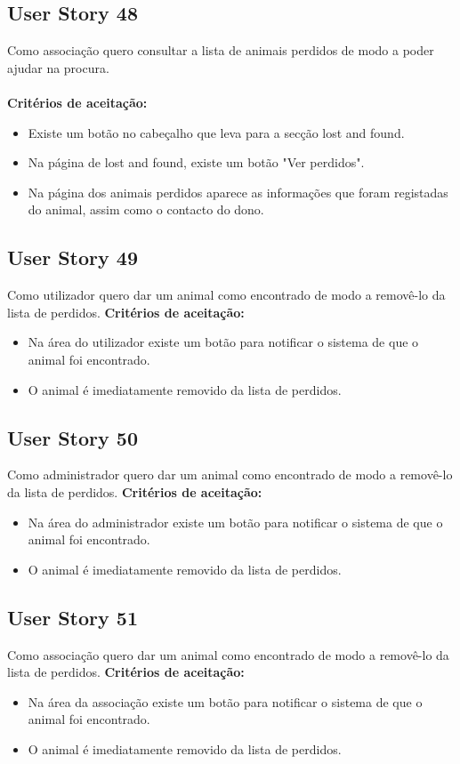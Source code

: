 \documentclass[a4paper,11pt]{article}
\begin{document}
\subsection*{User Story 48}
Como associação quero consultar a lista de animais perdidos de modo a poder ajudar na procura.\\\\
\textbf{Critérios de aceitação:}
\begin{itemize}
  \item Existe um botão no cabeçalho que leva para a secção lost and found.
  \item Na página de lost and found, existe um botão "Ver perdidos".
  \item Na página dos animais perdidos aparece as informações que foram registadas do animal, assim como o contacto do dono.
\end{itemize}

\subsection*{User Story 49}
Como utilizador quero dar um animal como encontrado de modo a removê-lo da lista de perdidos.
\textbf{Critérios de aceitação:}
\begin{itemize}
  \item Na área do utilizador existe um botão para notificar o sistema de que o animal foi encontrado.
  \item O animal é imediatamente removido da lista de perdidos.
\end{itemize}

\subsection*{User Story 50}
Como administrador quero dar um animal como encontrado de modo a removê-lo da lista de perdidos.
\textbf{Critérios de aceitação:}
\begin{itemize}
  \item Na área do administrador existe um botão para notificar o sistema de que o animal foi encontrado.
  \item O animal é imediatamente removido da lista de perdidos.
\end{itemize}

\subsection*{User Story 51}
Como associação quero dar um animal como encontrado de modo a removê-lo da lista de perdidos.
\textbf{Critérios de aceitação:}
\begin{itemize}
  \item Na área da associação existe um botão para notificar o sistema de que o animal foi encontrado.
  \item O animal é imediatamente removido da lista de perdidos.
\end{itemize}
\end{document}

